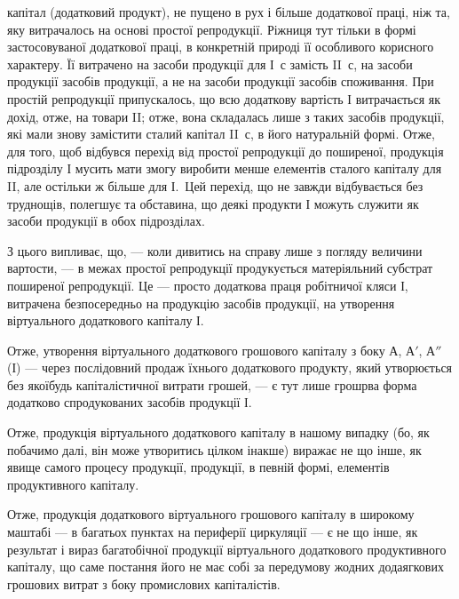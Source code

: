 \parcont{}  %
капітал (додатковий продукт), не пущено в рух і більше додаткової праці,
ніж та, яку витрачалось на основі простої репродукції. Ріжниця тут
тільки в формі застосовуваної додаткової праці, в конкретній природі її
особливого корисного характеру. Її витрачено на засоби продукції для
І~$с$ замість II~$с$, на засоби продукції засобів продукції, а не на засоби
продукції засобів споживання. При простій репродукції припускалось,
що всю додаткову вартість І витрачається як дохід, отже, на товари II;
отже, вона складалась лише з таких засобів продукції, які мали знову
замістити сталий капітал II~$с$, в його натуральній формі. Отже, для того,
щоб відбувся перехід від простої репродукції до поширеної, продукція підрозділу
І мусить мати змогу виробити менше елементів сталого капіталу
для II, але остільки ж більше для І.~Цей перехід, що не завжди відбувається
без труднощів, полегшує та обставина, що деякі продукти І
можуть служити як засоби продукції в обох підрозділах.

З цього випливає, що, — коли дивитись на справу лише з погляду величини
вартости, — в межах простої репродукції продукується матеріяльний
субстрат поширеної репродукції. Це — просто додаткова праця робітничої
кляси І, витрачена безпосередньо на продукцію засобів продукції, на утворення
віртуального додаткового капіталу І.

Отже, утворення віртуального додаткового грошового капіталу з боку
$А$, $А'$, $А''$ (І) — через послідовний продаж їхнього додаткового продукту,
який утворюється без якоїбудь капіталістичної витрати грошей, — є тут
лише грошрва форма додатково спродукованих засобів продукції І.

Отже, продукція віртуального додаткового капіталу в нашому випадку
(бо, як побачимо далі, він може утворитись цілком інакше) виражає не
що інше, як явище самого процесу продукції, продукції, в певній формі,
елементів продуктивного капіталу.

Отже, продукція додаткового віртуального грошового капіталу в широкому
маштабі — в багатьох пунктах на периферії циркуляції — є не що
інше, як результат і вираз багатобічної продукції віртуального додаткового
продуктивного капіталу, що саме постання його не має собі за передумову
жодних додаягкових грошових витрат з боку промислових капіталістів.

